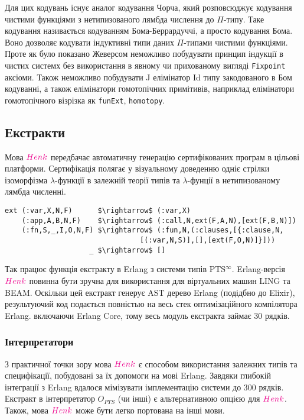 Для цих кодувань існує аналог кодування Чорча, який розповсюджує
кодування чистими функціями з нетипизованого лямбда числення до $\Pi$-типу.
Таке кодування називається кодуванням Бома-Беррардуччі, а просто кодування Бома.
Воно дозволяє кодувати індуктивні типи даних $\Pi$-типами чистими функціями.
Проте як було показано Жеверсом\cite{Geuvers01} неможливо побудувати принцип
індукції в чистих системх без використання в явному чи прихованому
вигляді \lstinline{Fixpoint} аксіоми. Також неможливо побудувати
J елімінатор Id типу закодованого в Бом кодуванні, а також
елімінатори гомотопічних примітивів, наприклад елімінатори гомотопічного
візрізка як \lstinline{funExt}, \lstinline{homotopy}.


\newpage
\subsection*{Екстракти}
Мова $\textcolor{magenta}{Henk}$ передбачає автоматичну генерацію сертифікованих програм в цільові платформи.
Сертифікація полягає у візуальному доведенню одніє стрілки ізоморфізма
$\lambda$-функції в залежній теорії типів та $\lambda$-фунції в нетипизованому лямбда численні.

\begin{lstlisting}[mathescape=true]
ext (:var,X,N,F)      $\rightarrow$ (:var,X)
    (:app,A,B,N,F)    $\rightarrow$ (:call,N,ext(F,A,N),[ext(F,B,N)])
    (:fn,S,_,I,O,N,F) $\rightarrow$ (:fun,N,(:clauses,[{:clause,N,
                                [(:var,N,S)],[],[ext(F,O,N)]}]))
                    _ $\rightarrow$ []
\end{lstlisting}

Так працює функція екстракту в Erlang з системи типів PTS$^\infty$.
Erlang-версія $\textcolor{magenta}{Henk}$ повинна бути зручна для використання для
віртуальних машин LING та BEAM. Оскільки цей екстракт генерує
AST дерево Erlang (подідбно до Elixir), результуючий код
подається повністью на весь стек оптимізаційного компілятора
Erlang. включаючи Erlang Core, тому весь модуль екстракта займає 30 рядків.

\newpage
\subsubsection{Інтерпретатори}
З практичної точки зору мова $\textcolor{magenta}{Henk}$ є способом використання залежних типів
та специфікації, побудовані за їх допомоги на мові Erlang.
Завдяки глибокій інтеграції з Erlang вдалося мімізувати імплементацію системи до 300 рядків.
Екстракт в інтерпретатор $O_{PTS}$ (чи інші) є альтернативною опцією для $\textcolor{magenta}{Henk}$.
Також, мова $\textcolor{magenta}{Henk}$ може бути легко портована на інші мови.

